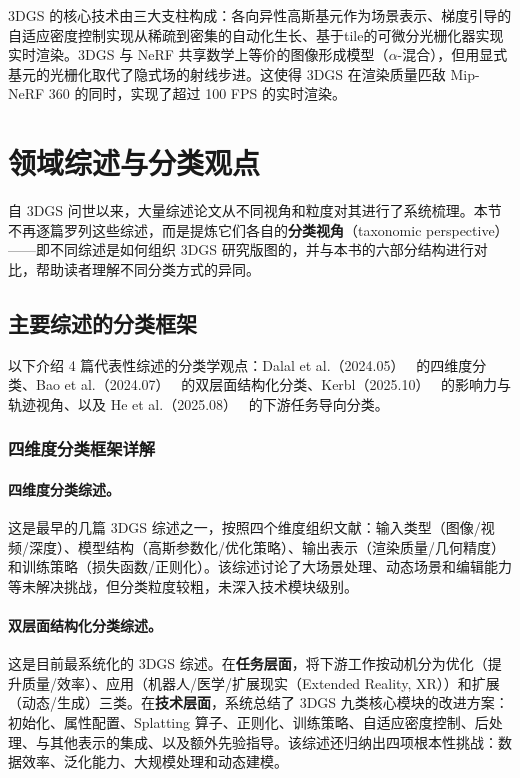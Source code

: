 \begin{takeaway}
3DGS 的核心技术由三大支柱构成：各向异性高斯基元作为场景表示、梯度引导的自适应密度控制实现从稀疏到密集的自动化生长、基于tile的可微分光栅化器实现实时渲染。3DGS 与 NeRF 共享数学上等价的图像形成模型（$\alpha$-混合），但用显式基元的光栅化取代了隐式场的射线步进。这使得 3DGS 在渲染质量匹敌 Mip-NeRF 360 的同时，实现了超过 100 FPS 的实时渲染。
\end{takeaway}



\section{领域综述与分类观点}
\label{sec:01_2}

自 3DGS 问世以来，大量综述论文从不同视角和粒度对其进行了系统梳理。本节不再逐篇罗列这些综述，而是提炼它们各自的\textbf{分类视角}（taxonomic perspective）——即不同综述是如何组织 3DGS 研究版图的，并与本书的六部分结构进行对比，帮助读者理解不同分类方式的异同。

\subsection{主要综述的分类框架}

以下介绍 4 篇代表性综述的分类学观点：Dalal et al.（2024.05）~\cite{2405_03417} 的四维度分类、Bao et al.（2024.07）~\cite{2407_17418} 的双层面结构化分类、Kerbl（2025.10）~\cite{2510_26694} 的影响力与轨迹视角、以及 He et al.（2025.08）~\cite{2508_09977} 的下游任务导向分类。

\subsubsection{四维度分类框架详解}

\paragraph{四维度分类综述。} 这是最早的几篇 3DGS 综述之一，按照四个维度组织文献：输入类型（图像/视频/深度）、模型结构（高斯参数化/优化策略）、输出表示（渲染质量/几何精度）和训练策略（损失函数/正则化）。该综述讨论了大场景处理、动态场景和编辑能力等未解决挑战，但分类粒度较粗，未深入技术模块级别。

\paragraph{双层面结构化分类综述。} 这是目前最系统化的 3DGS 综述。在\textbf{任务层面}，将下游工作按动机分为优化（提升质量/效率）、应用（机器人/医学/扩展现实（Extended Reality, XR））和扩展（动态/生成）三类。在\textbf{技术层面}，系统总结了 3DGS 九类核心模块的改进方案：初始化、属性配置、Splatting 算子、正则化、训练策略、自适应密度控制、后处理、与其他表示的集成、以及额外先验指导。该综述还归纳出四项根本性挑战：数据效率、泛化能力、大规模处理和动态建模。

